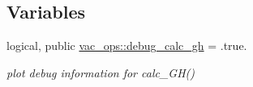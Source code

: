 \subsection*{Variables}
\begin{DoxyCompactItemize}
\item 
logical, public \hyperlink{namespacevac__ops_a411ea64592b7c75c56e9a37df15abe9c}{vac\+\_\+ops\+::debug\+\_\+calc\+\_\+gh} = .true.
\begin{DoxyCompactList}\small\item\em plot debug information for calc\+\_\+\+G\+H() \end{DoxyCompactList}\end{DoxyCompactItemize}
